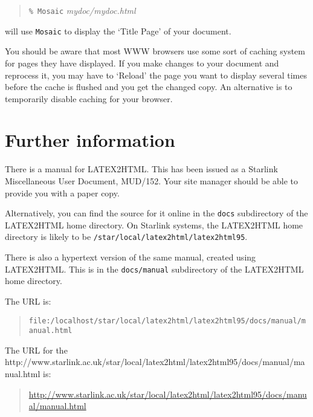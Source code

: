 \documentclass[twoside,11pt,nolof]{starlink}
\begin{document}
\begin{quote}
\texttt{\% Mosaic} \textit{mydoc/mydoc.html}
\end{quote}

will use \texttt{Mosaic} to display the `Title Page' of your document.

You should be aware that most WWW browsers use some sort of caching
system for pages they have displayed.  If you make changes to your
document and reprocess it, you may have to `Reload' the page you want to
display several times before the cache is flushed and you get the
changed copy.  An alternative is to temporarily disable caching for
your browser.

\section{Further information}

There is a manual for LATEX2HTML.  This has been issued as a Starlink
Miscellaneous User Document, MUD/152.  Your site manager should be able
to provide you with a paper copy.

Alternatively, you can find the source for it online in the \texttt{docs}
subdirectory of the LATEX2HTML home directory.  On Starlink systems,
the LATEX2HTML home directory is likely to be \texttt{/star/\-local/latex2html/latex2html95}.

There is also a hypertext version of the same manual, created using
LATEX2HTML.  This is in the \texttt{docs/manual} subdirectory of the
LATEX2HTML home directory.

The URL is:

\begin{quote}
{\small
\texttt{file:/localhost/star/local/latex2html/latex2html95/docs/manual/manual.html}
}
\end{quote}

The URL for the
{http://www.starlink.ac.uk/star/local/latex2html/latex2html95/docs/manual/manual.html}
is:

\begin{footnotesize}
\begin{quote}
\url{http://www.starlink.ac.uk/star/local/latex2html/latex2html95/docs/manual/manual.html}
\end{quote}
\end{footnotesize}
\end{document}
